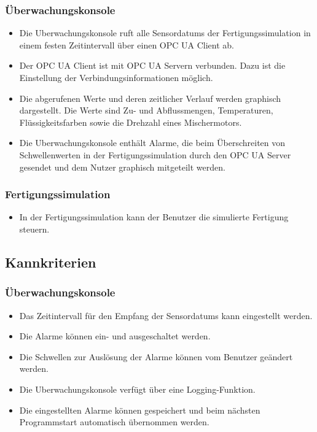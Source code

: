 \documentclass[parskip=full]{scrartcl}
\begin{document}
\subsubsection{Überwachungskonsole}
\begin{itemize}
  \item Die \gls{Uberwachungskonsole} ruft alle \glspl{Sensordatum} der \gls{Fertigungssimulation} in einem festen Zeitintervall über einen \gls{OPC UA} Client ab.
  \item Der \gls{OPC UA} Client ist mit \gls{OPC UA} Servern verbunden. Dazu ist die Einstellung der Verbindungsinformationen möglich.
  \item Die abgerufenen Werte und deren zeitlicher Verlauf werden graphisch dargestellt. Die Werte sind Zu- und Abflussmengen, Temperaturen, Flüssigkeitsfarben sowie die Drehzahl eines Mischermotors.
  \item Die \gls{Uberwachungskonsole} enthält Alarme, die beim Überschreiten von Schwellenwerten in der \gls{Fertigungssimulation} durch den \gls{OPC UA} Server gesendet
    und dem Nutzer graphisch mitgeteilt werden.
\end{itemize}

\subsubsection{Fertigungssimulation}
\begin{itemize}
  \item In der \gls{Fertigungssimulation} kann der Benutzer die simulierte Fertigung steuern.
\end{itemize}


\subsection{Kannkriterien}
\subsubsection{Überwachungskonsole}
\begin{itemize}
  \item Das Zeitintervall für den Empfang der \glspl{Sensordatum} kann eingestellt werden.
  \item Die Alarme k\"onnen ein- und ausgeschaltet werden.
  \item Die Schwellen zur Ausl\"osung der Alarme k\"onnen vom Benutzer ge\"andert werden.
  \item Die \gls{Uberwachungskonsole} verfügt über eine Logging-Funktion.
  \item Die eingestellten Alarme k\"onnen gespeichert und beim n\"achsten Programmstart automatisch
    \"ubernommen werden.
\end{itemize}
\end{document}
